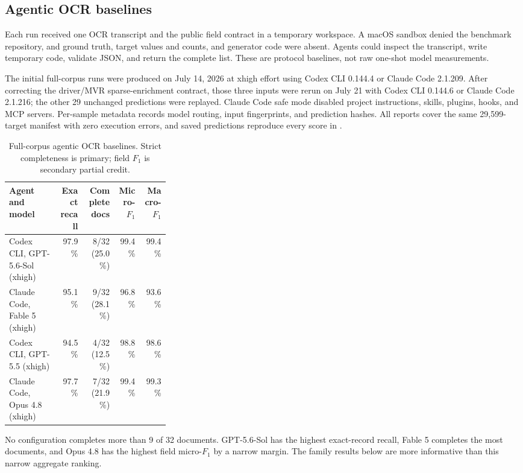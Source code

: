 \subsection{Agentic OCR baselines}
\label{subsec:current-ocr-baseline}
Each run received one OCR transcript and the public field contract in a temporary workspace. A macOS sandbox denied the benchmark repository, and ground truth, target values and counts, and generator code were absent. Agents could inspect the transcript, write temporary code, validate JSON, and return the complete list. These are protocol baselines, not raw one-shot model measurements.

The initial full-corpus runs were produced on July 14, 2026 at xhigh effort using Codex CLI 0.144.4 or Claude Code 2.1.209. After correcting the driver/MVR sparse-enrichment contract, those three inputs were rerun on July 21 with Codex CLI 0.144.6 or Claude Code 2.1.216; the other 29 unchanged predictions were replayed. Claude Code safe mode disabled project instructions, skills, plugins, hooks, and MCP servers. Per-sample metadata records model routing, input fingerprints, and prediction hashes. All reports cover the same 29{,}599-target manifest with zero execution errors, and saved predictions reproduce every score in .

\begin{table}[H]
\centering
\footnotesize
\caption{Full-corpus agentic OCR baselines. Strict completeness is primary; field $F_1$ is secondary partial credit.}
\label{tab:agentic-full-corpus}
\begin{tabular}{@{}p{0.31\linewidth}rrrr@{}}
\toprule
Agent and model & Exact recall & Complete docs & Micro-$F_1$ & Macro-$F_1$ \\
\midrule
Codex CLI, GPT-5.6-Sol (xhigh) & 97.9\% & 8/32 (25.0\%) & 99.4\% & 99.4\% \\
Claude Code, Fable 5 (xhigh) & 95.1\% & 9/32 (28.1\%) & 96.8\% & 93.6\% \\
Codex CLI, GPT-5.5 (xhigh) & 94.5\% & 4/32 (12.5\%) & 98.8\% & 98.6\% \\
Claude Code, Opus 4.8 (xhigh) & 97.7\% & 7/32 (21.9\%) & 99.4\% & 99.3\% \\
\bottomrule
\end{tabular}
\end{table}

No configuration completes more than 9 of 32 documents. GPT-5.6-Sol has the highest exact-record recall, Fable 5 completes the most documents, and Opus 4.8 has the highest field micro-$F_1$ by a narrow margin. The family results below are more informative than this narrow aggregate ranking.

